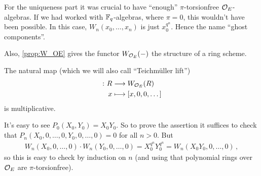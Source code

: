 \begin{urem}
	\begin{numerate}
		\item For the uniqueness part it was crucial to have \enquote{enough} $\pi$-torsionfree $\mathcal{O}_E$-algebras. If we had worked with $\mathbb{F}_q$-algebras, where $\pi=0$, this wouldn't have been possible. In this case, $W_n(x_0,\dotsc,x_n)$ is just $x_0^{q^n}$. Hence the name \enquote{ghost components}.
		
		\item Also, \cref{prop:W_OE} gives the functor $W_{\mathcal{O}_E}(-)$ the structure of a ring scheme.
	\end{numerate}
\end{urem}	
\begin{lem}\label{lem:W_OETeichmüller}
	The natural map (which we will also call \enquote{Teichmüller lift})
	\begin{align*}
		[-]\colon R&\morphism W_{\Oo_E}(R)\\
		x&\longmapsto [x,0,0,\dotsc]
	\end{align*}
	is multiplicative.
\end{lem}
\begin{proof*}
	It's easy to see $P_0(X_0,Y_0)=X_0Y_0$. So to prove the assertion it suffices to check that $P_n(X_0,0,\dotsc,0,Y_0,0,\dotsc,0)=0$ for all $n>0$. But
	\begin{align*}
		W_n(X_0,0,\dotsc,0)\cdot W_n(Y_0,0,\dotsc,0)=X_0^{q^n}Y_0^{q^n}=W_n(X_0Y_0,0,\dotsc,0)\,,
	\end{align*}
	so this is easy to check by induction on $n$ (and using that polynomial rings over $\mathcal{O}_E$ are $\pi$-torsionfree).
\end{proof*}
